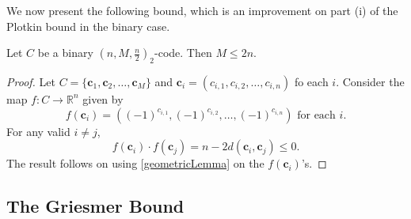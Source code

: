 We now present the following bound, which is an improvement on part (i) of the Plotkin bound in the binary case.

\begin{theorem}
    Let $C$ be a binary $(n,M,\frac{n}{2})_2$-code. Then $M\leq 2n$.
\end{theorem}
\begin{proof}
    Let $C=\{\textbf{c}_1,\textbf{c}_2,\ldots,\textbf{c}_M\}$ and $\textbf{c}_i=(c_{i,1},c_{i,2},\ldots,c_{i,n})$ fo each $i$. Consider the map $f:C\to\mathbb{R}^n$ given by
    $$f(\textbf{c}_i)=((-1)^{c_{i,1}}, (-1)^{c_{i,2}},\ldots,(-1)^{c_{i,n}}) \text{ for each $i$.}$$
    For any valid $i\neq j$,
    $$f(\textbf{c}_i)\cdot f(\textbf{c}_j)=n-2d(\textbf{c}_i,\textbf{c}_j)\leq 0.$$
    The result follows on using \ref{geometricLemma} on the $f(\textbf{c}_i)$'s.
\end{proof}

\subsection{The Griesmer Bound}

